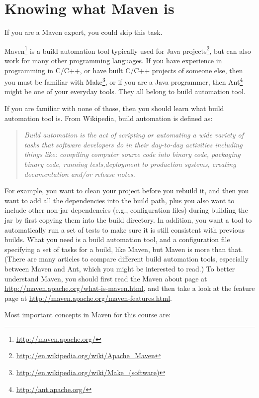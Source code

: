 
\section{Knowing what Maven is}

If you are a Maven expert, you could skip this task.

Maven\footnote{\url{http://maven.apache.org/}} is a build automation tool typically used for Java projects\footnote{\url{http://en.wikipedia.org/wiki/Apache_Maven}}, but can also work for many other programming languages. If you have experience in programming in C/C++, or have built C/C++ projects of someone else, then you must be familiar with Make\footnote{\url{http://en.wikipedia.org/wiki/Make_(software)}}, or if you are a Java programmer, then Ant\footnote{\url{http://ant.apache.org/}} might be one of your everyday tools. They all belong to build automation tool.

If you are familiar with none of those, then you should learn what build automation tool is. From Wikipedia, build automation is defined as:

\begin{quote}
\emph{Build automation is the act of scripting or automating a wide variety of tasks that software developers do in their day-to-day activities including things like: compiling computer source code into binary code, packaging binary code, running tests,deployment to production systems, creating documentation and/or release notes.}
\end{quote}

For example, you want to clean your project before you rebuild it, and then you want to add all the dependencies into the build path, plus you also want to include other non-jar dependencies (e.g., configuration files) during building the jar by first copying them into the build directory. In addition, you want a tool to automatically run a set of tests to make sure it is still consistent with previous builds. What you need is a build automation tool, and a configuration file specifying a set of tasks for a build, like Maven, but Maven is more than that. (There are many articles to compare different build automation tools, especially between Maven and Ant, which you might be interested to read.) To better understand Maven, you should first read the Maven about page at \url{http://maven.apache.org/what-is-maven.html}, and then take a look at the feature page at \url{http://maven.apache.org/maven-features.html}.

Most important concepts in Maven for this course are:

